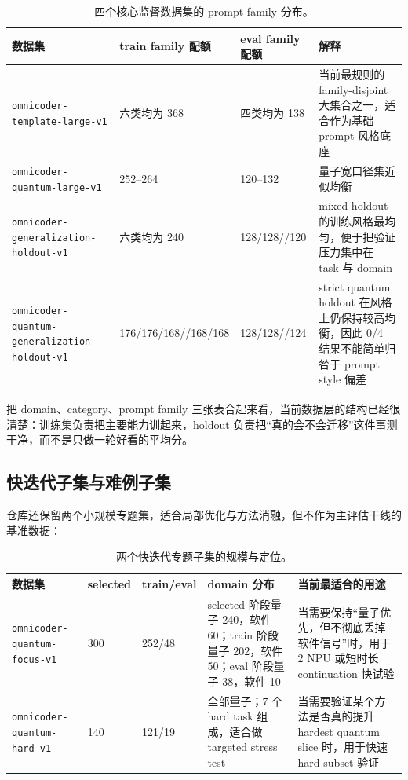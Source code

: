 \documentclass[11pt,a4paper]{article}
\newcommand{\code}[1]{\begingroup\ttfamily\footnotesize\nolinkurl{#1}\endgroup}
\begin{document}
\begin{table}[htbp]
\centering
\small
\begin{tabularx}{\textwidth}{p{3.3cm} p{2.3cm} p{2.3cm} Y}
\toprule
数据集 & train family 配额 & eval family 配额 & 解释 \\
\midrule
\code{omnicoder-template-large-v1} & 六类均为 368 & 四类均为 138 & 当前最规则的 family-disjoint 大集合之一，适合作为基础 prompt 风格底座 \\
\code{omnicoder-quantum-large-v1} & 252--264 & 120--132 & 量子宽口径集近似均衡 \\
\code{omnicoder-generalization-holdout-v1} & 六类均为 240 & 128/128//120 & mixed holdout 的训练风格最均匀，便于把验证压力集中在 task 与 domain \\
\code{omnicoder-quantum-generalization-holdout-v1} & 176/176/168//168/168 & 128/128//124 & strict quantum holdout 在风格上仍保持较高均衡，因此 0/4 结果不能简单归咎于 prompt style 偏差 \\
\bottomrule
\end{tabularx}
\caption{四个核心监督数据集的 prompt family 分布。}
\label{tab:core-dataset-prompts}
\end{table}

把 domain、category、prompt family 三张表合起来看，当前数据层的结构已经很清楚：训练集负责把主要能力训起来，holdout 负责把“真的会不会迁移”这件事测干净，而不是只做一轮好看的平均分。

\subsection{快迭代子集与难例子集}

仓库还保留两个小规模专题集，适合局部优化与方法消融，但不作为主评估干线的基准数据：

\begin{table}[htbp]
\centering
\small
\begin{tabularx}{\textwidth}{p{3.0cm} p{1.7cm} p{1.7cm} p{2.0cm} Y}
\toprule
数据集 & selected & train/eval & domain 分布 & 当前最适合的用途 \\
\midrule
\code{omnicoder-quantum-focus-v1} & 300 & 252/48 & selected 阶段量子 240，软件 60；train 阶段量子 202，软件 50；eval 阶段量子 38，软件 10 & 当需要保持“量子优先，但不彻底丢掉软件信号”时，用于 2 NPU 或短时长 continuation 快试验 \\
\code{omnicoder-quantum-hard-v1} & 140 & 121/19 & 全部量子；7 个 hard task 组成，适合做 targeted stress test & 当需要验证某个方法是否真的提升 hardest quantum slice 时，用于快速 hard-subset 验证 \\
\bottomrule
\end{tabularx}
\caption{两个快迭代专题子集的规模与定位。}
\label{tab:fast-iteration-subsets}
\end{table}
\end{document}
